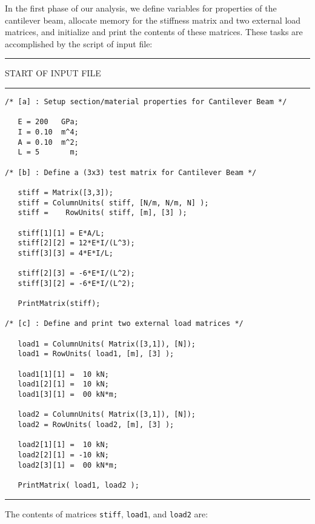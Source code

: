 \vspace{0.15 in}\noindent
In the first phase of our analysis, we define variables for
properties of the cantilever beam, allocate memory for the
stiffness matrix and two external load matrices,
and initialize and print the contents of these matrices.
These tasks are accomplished by the script of input file:

\vspace{0.10 in}
\begin{footnotesize}
\noindent
{\rule{2.3 in}{0.035 in} START OF INPUT FILE \rule{2.3 in}{0.035 in} }
\begin{verbatim}
/* [a] : Setup section/material properties for Cantilever Beam */

   E = 200   GPa;
   I = 0.10  m^4;
   A = 0.10  m^2;
   L = 5       m;

/* [b] : Define a (3x3) test matrix for Cantilever Beam */

   stiff = Matrix([3,3]);
   stiff = ColumnUnits( stiff, [N/m, N/m, N] );
   stiff =    RowUnits( stiff, [m], [3] );

   stiff[1][1] = E*A/L;
   stiff[2][2] = 12*E*I/(L^3);
   stiff[3][3] = 4*E*I/L;

   stiff[2][3] = -6*E*I/(L^2);
   stiff[3][2] = -6*E*I/(L^2);

   PrintMatrix(stiff);

/* [c] : Define and print two external load matrices */

   load1 = ColumnUnits( Matrix([3,1]), [N]);
   load1 = RowUnits( load1, [m], [3] );

   load1[1][1] =  10 kN;
   load1[2][1] =  10 kN;
   load1[3][1] =  00 kN*m;

   load2 = ColumnUnits( Matrix([3,1]), [N]);
   load2 = RowUnits( load2, [m], [3] );

   load2[1][1] =  10 kN;
   load2[2][1] = -10 kN;
   load2[3][1] =  00 kN*m;

   PrintMatrix( load1, load2 );
\end{verbatim}
\rule{6.25 in}{0.035 in}
\end{footnotesize}

\vspace{0.15 in}\noindent
The contents of matrices {\tt stiff}, {\tt load1}, and {\tt load2} are:

